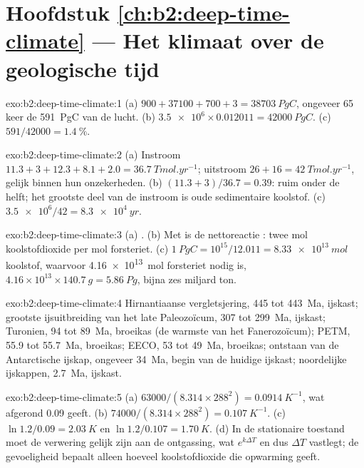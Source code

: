 \section*{Hoofdstuk \ref{ch:b2:deep-time-climate} --- Het klimaat over de geologische tijd}

\begin{solution}{exo:b2:deep-time-climate:1}
(a) $900 + 37100 + 700 + 3 = \qty{38703}{PgC}$, ongeveer 65 keer de \qty{591}{PgC} van de lucht.
(b) $\num{3.5e6}\times0.012011 = \qty{42000}{PgC}$. (c) $591/42000 = \qty{1.4}{\percent}$.
\end{solution}

\begin{solution}{exo:b2:deep-time-climate:2}
(a) Instroom $11.3 + 3 + 12.3 + 8.1 + 2.0 = \qty{36.7}{Tmol.yr^{-1}}$; uitstroom $26 + 16 =
\qty{42}{Tmol.yr^{-1}}$, gelijk binnen hun onzekerheden. (b) $(11.3 + 3)/36.7 = 0.39$: ruim
onder de helft; het grootste deel van de instroom is oude sedimentaire koolstof. (c) $\num{3.5e6}/42 = \qty{8.3e4}{yr}$.
\end{solution}

\begin{solution}{exo:b2:deep-time-climate:3}
(a) . (b) Met  is de nettoreactie : twee mol
koolstofdioxide per mol forsteriet. (c) $\qty{1}{PgC} = 10^{15}/12.011 =
\qty{8.33e13}{mol}$ koolstof, waarvoor \qty{4.16e13}{mol} forsteriet nodig is, $4.16\times10^{13}
\times\qty{140.7}{g} = \qty{5.86}{Pg}$, bijna zes miljard ton.
\end{solution}

\begin{solution}{exo:b2:deep-time-climate:4}
Hirnantiaanse vergletsjering, 445 tot \qty{443}{Ma}, ijskast; grootste ijsuitbreiding van het late Paleozoïcum, 307 tot
\qty{299}{Ma}, ijskast; Turonien, 94 tot \qty{89}{Ma}, broeikas (de warmste van het Fanerozoïcum);
PETM, 55.9 tot \qty{55.7}{Ma}, broeikas; EECO, 53 tot \qty{49}{Ma}, broeikas; ontstaan van de
Antarctische ijskap, ongeveer \qty{34}{Ma}, begin van de huidige ijskast; noordelijke ijskappen,
\qty{2.7}{Ma}, ijskast.
\end{solution}

\begin{solution}{exo:b2:deep-time-climate:5}
(a) $63000/(8.314\times288^2) = \qty{0.0914}{K^{-1}}$, wat afgerond 0.09 geeft. (b) $74000/(8.314
\times288^2) = \qty{0.107}{K^{-1}}$. (c) $\ln1.2/0.09 = \qty{2.03}{K}$ en $\ln 1.2/0.107 =
\qty{1.70}{K}$. (d) In de stationaire toestand moet de verwering gelijk zijn aan de ontgassing, wat $e^{k
\Delta T}$ en dus $\Delta T$ vastlegt; de gevoeligheid bepaalt alleen hoeveel koolstofdioxide die
opwarming geeft.
\end{solution}

